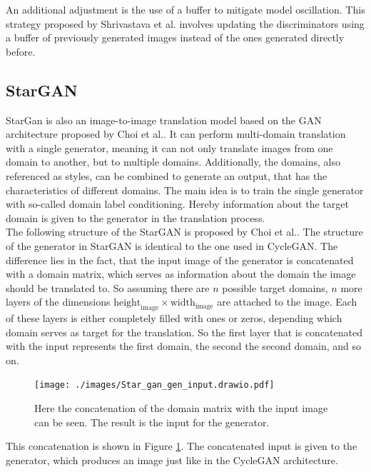 An additional adjustment is the use of a buffer to mitigate model oscillation.
This strategy proposed by Shrivastava et al. \cite{Shrivastava2016} involves updating the discriminators using a buffer of previously generated images instead of the ones generated directly before. 


\subsection{StarGAN}\label{star_gan}
StarGan is also an image-to-image translation model based on the GAN architecture proposed by Choi et al.\cite{choi2018stargan}.
It can perform multi-domain translation with a single generator, meaning it can not only translate images from one domain to another, but to multiple domains.
Additionally, the domains, also referenced as styles, can be combined to generate an output, that has the characteristics of different domains.
The main idea is to train the single generator with so-called domain label conditioning. %
Hereby information about the target domain is given to the generator in the translation process.\\
The following structure of the StarGAN is proposed by Choi et al.\cite{choi2018stargan}.
The structure of the generator in StarGAN is identical to the one used in CycleGAN.
The difference lies in the fact, that the input image of the generator is concatenated with a domain matrix, which serves as information about the domain the image should be translated to.
So assuming there are $n$ possible target domains, $n$ more layers of the dimensions $\text{height}_{\text{image}} \times \text{width}_{\text{image}}$ are attached to the image.
Each of these layers is either completely filled with ones or zeros, depending which domain serves as target for the translation.
So the first layer that is concatenated with the input represents the first domain, the second the second domain, and so on.
\begin{figure}[b]
    \begin{center}
     \texttt{[image: ./images/Star\_gan\_gen\_input.drawio.pdf]}
    \caption[Domain concatenation StarGAN]{{Here the concatenation of the domain matrix with the input image can be seen. The result is the input for the generator.
    }\label{star_gan_input}}
    \end{center}
\end{figure}
This concatenation is shown in Figure \ref{star_gan_input}.
The concatenated input is given to the generator, which produces an image just like in the CycleGAN architecture.
